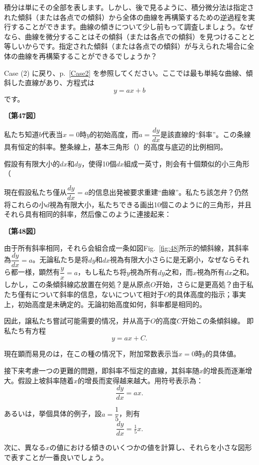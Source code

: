\documentclass[a4paper,11pt,openany]{ltjsbook}
\newcommand{\Pageref}[2][p.]{#1~\ref{#2}}
\newcommand{\Fig}[1]{Fig.~\ref{fig:#1}}
\begin{document}
積分は単にその全部を表します。しかし、後で見るように、積分微分法は指定された傾斜（または各点での傾斜）から全体の曲線を再構築するための逆過程を実行することができます。曲線の傾きについて少し前もって調査しましょう。なぜなら、曲線を微分することはその傾斜（または各点での傾斜）を見つけることと等しいからです。指定された傾斜（または各点での傾斜）が与えられた場合に全体の曲線を再構築することができるでしょうか？

Case (2) に戻り、\Pageref{Case2} を参照してください。ここでは最も単純な曲線、傾斜した直線があり、方程式は
\[
y = ax + b
\]
です。\par\textbf{〔第47図〕}\par

私たち知道$b$代表当$x=0$時$y$的初始高度，而$a=\dfrac{dy}{dx}$是該直線的“斜率”。この条線具有恒定的斜率。整条線上，基本三角形（）的高度与底辺的比例相同。

假設有有限大小的$dx$和$dy$，使得10個$dx$組成一英寸，則会有十個類似的小三角形（

  

現在假設私たち僅从$\dfrac{dy}{dx}=a$的信息出発被要求重建“曲線”。私たち該怎弁？仍然将これらの小$d$視為有限大小，私たちできる画出10個このように的三角形，并且それら具有相同的斜率，然后像このように連接起来：
\par\textbf{〔第48図〕}\par

由于所有斜率相同，それら会組合成一条如図\Fig{48}所示的傾斜線，其斜率為$\dfrac{dy}{dx}=a$。无論私たち是将$dy$和$dx$視為有限大小さらに是无窮小，なぜならそれら都一様，顕然有$\dfrac{y}{x}=a$，もし私たち将$y$視為所有$dy$之和，而$x$視為所有$dx$之和。しかし，この条傾斜線応放置在何処？是从原点$O$开始，さらに是更高処？由于私たち僅有について斜率的信息，ないについて相対于$O$的具体高度的指示；事実上，初始高度是未确定的。无論初始高度如何，斜率都是相同的。

因此，譲私たち嘗試可能需要的情况，并从高于$O$的高度$C$开始この条傾斜線。
即私たち有方程
\[
y = ax + C.
\]

現在顕而易見のは，在この種の情况下，附加常数表示当$x=0$時$y$的具体値。

接下来考慮一つの更難的問題，即斜率不恒定的直線，其斜率随$x$的增長而逐漸增大。假設上坡斜率随着$x$的增長而変得越来越大。用符号表示為：
\[
\dfrac{dy}{dx} = ax.
\]

あるいは，挙個具体的例子，設$a=\dfrac{1}{5}$，則有
\[
\dfrac{dy}{dx} = \tfrac{1}{5} x.
\]

次に、異なる$x$の値における傾きのいくつかの値を計算し、それらを小さな図形で表すことが一番良いでしょう。
\end{document}
